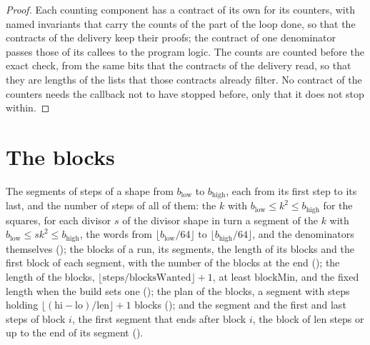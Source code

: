 \begin{proof}
  \leanok
  Each counting component has a contract of its own for its counters, with named invariants that
  carry the counts of the part of the loop done, so that the contracts of the delivery keep their
  proofs; the contract of one denominator passes those of its callees to the program logic. The
  counts are counted before the exact check, from the same bits that the contracts of the delivery
  read, so that they are lengths of the lists that those contracts already filter. No contract of
  the counters needs the callback not to have stopped before, only that it does not stop within.
\end{proof}

\section{The blocks}\label{sec:blocks}

\begin{definition}\label{def:blockPlan}
  \leanok
  The segments of steps of a shape from $b_{\mathrm{low}}$ to $b_{\mathrm{high}}$, each from its
  first step to its last, and the number of steps of all of them: the $k$ with
  $b_{\mathrm{low}} \le k^2 \le b_{\mathrm{high}}$ for the squares, for each divisor $s$ of the
  divisor shape in turn a segment of the $k$ with
  $b_{\mathrm{low}} \le s k^2 \le b_{\mathrm{high}}$, the words from
  $\lfloor b_{\mathrm{low}}/64 \rfloor$ to $\lfloor b_{\mathrm{high}}/64 \rfloor$, and the
  denominators themselves (); the blocks of a run, its segments,
  the length of its blocks and the first block of each segment, with the number of the blocks at the
  end (); the length of the blocks,
  $\lfloor \mathrm{steps}/\mathrm{blocksWanted} \rfloor + 1$, at least $\mathrm{blockMin}$, and the
  fixed length when the build sets one (); the plan of the
  blocks, a segment with steps holding
  $\lfloor (\mathrm{hi} - \mathrm{lo})/\mathrm{len} \rfloor + 1$ blocks
  (); and the segment and the first and last steps of block $i$,
  the first segment that ends after block $i$, the block of $\mathrm{len}$ steps or up to the end of
  its segment ().
\end{definition}

